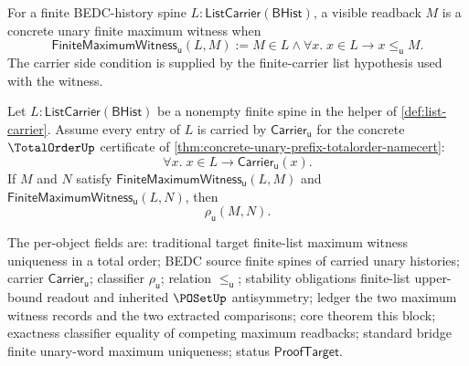 \begin{definition}
\label{def:totalorder-prefix-finite-maximum-witness}
For a finite BEDC-history spine $L:\mathsf{ListCarrier}(\mathsf{BHist})$, a visible readback $M$ is a concrete unary finite maximum witness when
$$
\mathsf{FiniteMaximumWitness}_{\mathsf{u}}(L,M)
:=
M\in L
\land
\forall x.\; x\in L\to x\le_{\mathsf{u}}M.
$$
The carrier side condition is supplied by the finite-carrier list hypothesis used with the witness.
\end{definition}

\begin{theorem}
\label{thm:totalorder-prefix-finite-maximum-classifier-unique}
Let $L:\mathsf{ListCarrier}(\mathsf{BHist})$ be a nonempty finite spine in the helper of \autoref{def:list-carrier}. Assume every entry of $L$ is carried by $\mathsf{Carrier}_{\mathsf{u}}$ for the concrete $\TotalOrderUp$ certificate of \autoref{thm:concrete-unary-prefix-totalorder-namecert}:
$$
\forall x.\; x\in L\to \mathsf{Carrier}_{\mathsf{u}}(x).
$$
If $M$ and $N$ satisfy $\mathsf{FiniteMaximumWitness}_{\mathsf{u}}(L,M)$ and $\mathsf{FiniteMaximumWitness}_{\mathsf{u}}(L,N)$, then
$$
\rho_{\mathsf{u}}(M,N).
$$

The per-object fields are: traditional target finite-list maximum witness uniqueness in a total order; BEDC source finite spines of carried unary histories; carrier $\mathsf{Carrier}_{\mathsf{u}}$; classifier $\rho_{\mathsf{u}}$; relation $\le_{\mathsf{u}}$; stability obligations finite-list upper-bound readout and inherited $\POSetUp$ antisymmetry; ledger the two maximum witness records and the two extracted comparisons; core theorem this block; exactness classifier equality of competing maximum readbacks; standard bridge finite unary-word maximum uniqueness; status $\mathsf{ProofTarget}$.
\end{theorem}
